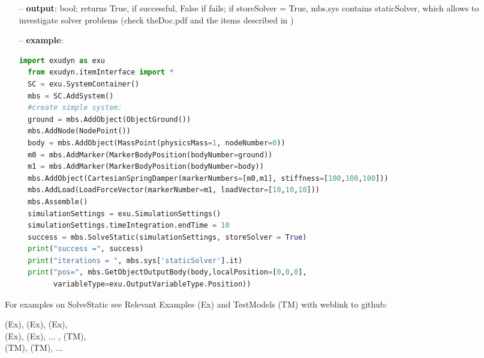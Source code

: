 \begin{itemize}[leftmargin=0.7cm]
\begin{itemize}[leftmargin=1.2cm]
\end{itemize}
\item[--]
{\bf output}: bool; returns True, if successful, False if fails; if storeSolver = True, mbs.sys contains staticSolver, which allows to investigate solver problems (check theDoc.pdf  and the items described in )
\item[--]
{\bf example}: \vspace{-12pt}\ei\begin{lstlisting}[language=Python, xleftmargin=36pt]
  import exudyn as exu
  from exudyn.itemInterface import *
  SC = exu.SystemContainer()
  mbs = SC.AddSystem()
  #create simple system:
  ground = mbs.AddObject(ObjectGround())
  mbs.AddNode(NodePoint())
  body = mbs.AddObject(MassPoint(physicsMass=1, nodeNumber=0))
  m0 = mbs.AddMarker(MarkerBodyPosition(bodyNumber=ground))
  m1 = mbs.AddMarker(MarkerBodyPosition(bodyNumber=body))
  mbs.AddObject(CartesianSpringDamper(markerNumbers=[m0,m1], stiffness=[100,100,100]))
  mbs.AddLoad(LoadForceVector(markerNumber=m1, loadVector=[10,10,10]))
  mbs.Assemble()
  simulationSettings = exu.SimulationSettings()
  simulationSettings.timeIntegration.endTime = 10
  success = mbs.SolveStatic(simulationSettings, storeSolver = True)
  print("success =", success)
  print("iterations = ", mbs.sys['staticSolver'].it)
  print("pos=", mbs.GetObjectOutputBody(body,localPosition=[0,0,0],
        variableType=exu.OutputVariableType.Position))
\end{lstlisting}\vspace{-24pt}\bi\item[]\vspace{-24pt}\vspace{12pt}\end{itemize}
%

%
\noindent For examples on SolveStatic see Relevant Examples (Ex) and TestModels (TM) with weblink to github:
\bi
 \item \footnotesize {} (Ex), 
 (Ex), 
 (Ex), 
\\  (Ex), 
 (Ex), 
 ...
, 
 (TM), 
\\  (TM), 
 (TM), 
 ...

